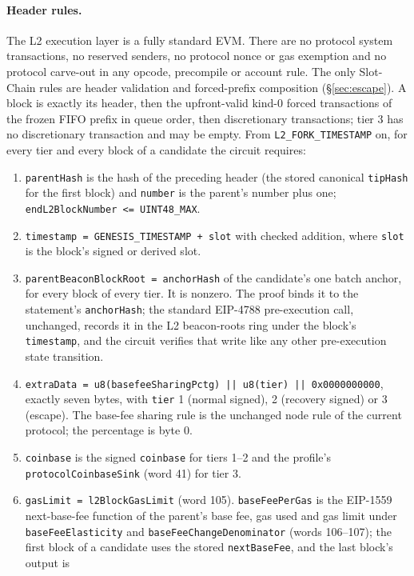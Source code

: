 \documentclass[a4paper,11pt]{article}
\newcommand{\code}[1]{\nolinkurl{#1}}
\begin{document}
\paragraph{Header rules.}\label{sec:header-rules}
The L2 execution layer is a fully standard EVM.  There are no protocol system
transactions, no reserved senders, no protocol nonce or gas exemption and no
protocol carve-out in any opcode, precompile or account rule.  The only
Slot-Chain rules are header validation and forced-prefix composition
(\S\ref{sec:escape}).  A block is exactly its header, then the upfront-valid
kind-0 forced transactions of the frozen FIFO prefix in queue order, then
discretionary transactions; tier 3 has no discretionary transaction and may be
empty.  From \code{L2_FORK_TIMESTAMP} on, for every tier and every block of a
candidate the circuit requires:
\begin{enumerate}
\item \code{parentHash} is the hash of the preceding header (the stored
  canonical \code{tipHash} for the first block) and \code{number} is the
  parent's number plus one; \code{endL2BlockNumber <= UINT48_MAX}.
\item \code{timestamp = GENESIS_TIMESTAMP + slot} with checked addition, where
  \code{slot} is the block's signed or derived slot.
\item \code{parentBeaconBlockRoot = anchorHash} of the candidate's one batch
  anchor, for every block of every tier.  It is nonzero.  The proof binds it
  to the statement's \code{anchorHash}; the standard EIP-4788 pre-execution
  call, unchanged, records it in the L2 beacon-roots ring under the block's
  \code{timestamp}, and the circuit verifies that write like any other
  pre-execution state transition.
\item \code{extraData = u8(basefeeSharingPctg) || u8(tier) || 0x0000000000},
  exactly seven bytes, with \code{tier} 1 (normal signed), 2 (recovery
  signed) or 3 (escape).  The base-fee sharing rule is the unchanged node
  rule of the current protocol; the percentage is byte 0.
\item \code{coinbase} is the signed \code{coinbase} for tiers 1--2 and the
  profile's \code{protocolCoinbaseSink} (word 41) for tier 3.
\item \code{gasLimit = l2BlockGasLimit} (word 105).  \code{baseFeePerGas} is
  the EIP-1559 next-base-fee function of the parent's base fee, gas used and
  gas limit under \code{baseFeeElasticity} and
  \code{baseFeeChangeDenominator} (words 106--107); the first block of a
  candidate uses the stored \code{nextBaseFee}, and the last block's output is

\end{enumerate}
\end{document}
